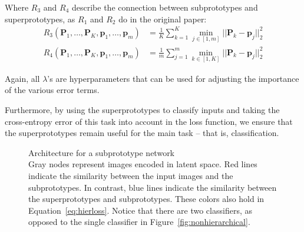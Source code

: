 Where $R_3$ and $R_4$ describe the connection between subprototypes and superprototypes, as $R_1$ and $R_2$ do in the original paper:
\begin{align*}
    R_3(\bm{P}_1, \dots, \bm{P}_K, \bm{p}_1, \dots, \bm{p}_m) &= \frac{1}{K}\sum_{k=1}^K \min_{j\in [1,m]}||\bm{P}_k- \bm{p}_j||^2_2 \\
     R_4(\bm{P}_1, \dots, \bm{P}_K, \bm{p}_1, \dots, \bm{p}_m) &= \frac{1}{m}\sum_{j=1}^m \min_{k\in [1,K]}||\bm{P}_k- \bm{p}_j||^2_2
 \end{align*}

Again, all $\lambda$'s are hyperparameters that can be used for adjusting the importance of the various error terms.

Furthermore, by using the superprototypes to classify inputs and taking the cross-entropy error of this task into account in the loss function, we ensure that the superprototypes remain useful for the main task -- that is, classification. 

\begin{figure}[hb]
    \centering
    
    \caption{Architecture for a subprototype network\\ {\normalfont Gray nodes represent images encoded in latent space. {\color{red} Red} lines indicate the similarity between the input images and the subprototypes. In contrast, {\color{blue} blue} lines indicate the similarity between the superprototypes and subprototypes. These colors also hold in Equation~\ref{eq:hierloss}. Notice that there are two classifiers, as opposed to the single classifier in Figure~\ref{fig:nonhierarchical}.}}
    \label{fig:hierarchical}
\end{figure}

